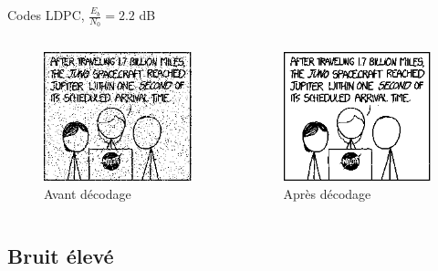 \documentclass[11pt]{beamer}
\begin{document}
\begin{frame}{Codes LDPC, $\frac{E_b}{N_0} = 2.2$ dB}
	\begin{columns}
		\begin{column}{.5\textwidth}
			\begin{figure}
				\includegraphics[scale=0.6]{ldpc_basic_noisy_60}\\
				Avant d\'ecodage
			\end{figure}
		\end{column}
		\begin{column}{.5\textwidth}
			\begin{figure}
				\includegraphics[scale=0.6]{ldpc_basic_decoded_60}\\
				Apr\`es d\'ecodage
			\end{figure}
		\end{column}
	\end{columns}
\end{frame}


\subsection{Bruit \'elev\'e}
\end{document}
